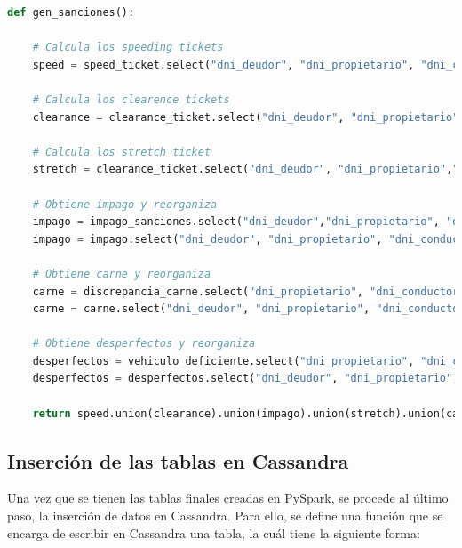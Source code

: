 \documentclass[]{article}
\begin{document}
\begin{lstlisting}[language=python, caption=Carga de datos en PySpark]
def gen_sanciones():

    # Calcula los speeding tickets
    speed = speed_ticket.select("dni_deudor", "dni_propietario", "dni_conductor", "fecha_grabacion", "estado", "matricula", "cantidad").withColumn("tipo", lit("velocidad"))

    # Calcula los clearence tickets
    clearance = clearance_ticket.select("dni_deudor", "dni_propietario","dni_conductor", "fecha_grabacion", "estado", "matricula", "cantidad").withColumn("tipo", lit("clearance"))

    # Calcula los stretch ticket
    stretch = clearance_ticket.select("dni_deudor", "dni_propietario","dni_conductor", "fecha_grabacion", "estado" ,"matricula", "cantidad").withColumn("tipo", lit("stretch"))

    # Obtiene impago y reorganiza
    impago = impago_sanciones.select("dni_deudor","dni_propietario", "dni_conductor", "fecha_grabacion", "cantidad", "matricula").withColumn("tipo", lit("impago")).withColumn("estado", lit("stand by"))
    impago = impago.select("dni_deudor", "dni_propietario", "dni_conductor", "fecha_grabacion", "estado", "matricula", "cantidad", "tipo")

    # Obtiene carne y reorganiza
    carne = discrepancia_carne.select("dni_propietario", "dni_conductor", "fecha_record", "matricula").withColumn("tipo", lit("discrepancia carne")).withColumn("estado", lit("stand by")).withColumn("cantidad", lit(1000)).withColumn("dni_deudor", discrepancia_carne["dni_conductor"])
    carne = carne.select("dni_deudor", "dni_propietario", "dni_conductor", "fecha_record", "estado", "matricula", "cantidad", "tipo")

    # Obtiene desperfectos y reorganiza
    desperfectos = vehiculo_deficiente.select("dni_propietario", "dni_conductor", "fecha_record", "matricula").withColumn("tipo", lit("discrepancia carne")).withColumn("estado", lit("stand by")).withColumn("cantidad", lit(1000)).withColumn("dni_deudor", vehiculo_deficiente["dni_propietario"])
    desperfectos = desperfectos.select("dni_deudor", "dni_propietario", "dni_conductor", "fecha_record", "estado", "matricula","cantidad", "tipo")

    return speed.union(clearance).union(impago).union(stretch).union(carne).union(desperfectos)
\end{lstlisting}

\subsection{Inserción de las tablas en Cassandra}
Una vez que se tienen las tablas finales creadas en PySpark, se procede al último paso, la inserción de datos en Cassandra. Para ello, se define una función que se encarga de escribir en Cassandra una tabla, la cuál tiene la siguiente forma:
\end{document}
